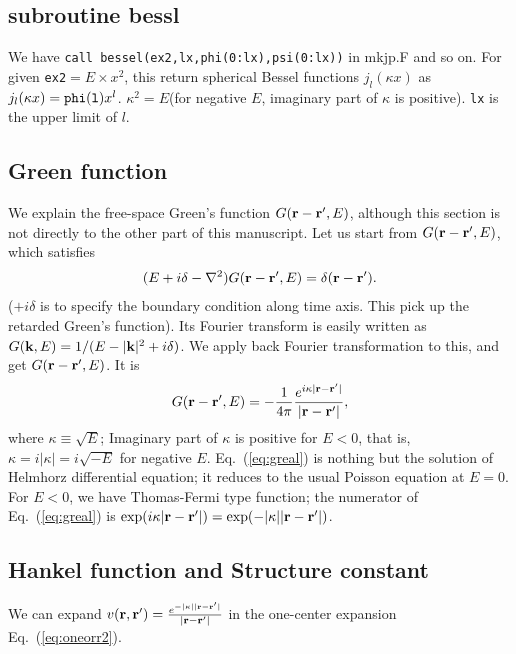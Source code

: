 \documentclass[a4paper,10pt,epsf,fleqn]{article}
\newcommand{\bfk}{{\bf k}}
\newcommand{\bfr}{{\bf r}}
\newcommand{\req}[1]{\mbox{Eq.~(\ref{#1})}}
\begin{document}
\subsection{subroutine bessl}
We have  \verb#call bessel(ex2,lx,phi(0:lx),psi(0:lx))# in mkjp.F 
and so on. For given \verb#ex2#$=E\times x^2$,
this return spherical Bessel functions $j_l(\kappa x)$
as $j_l(\kappa x)={\tt phi(l)}x^l$.
$\kappa^2=E$(for negative $E$, imaginary part of $\kappa$ is positive). 
\verb!lx! is the upper limit of $l$.


\subsection{Green function}
We explain the free-space Green's function
$G(\bfr-\bfr',E)$, although this section is not directly to the
other part of this manuscript.
Let us start from $G(\bfr-\bfr',E)$, which satisfies
\begin{eqnarray}
(E+i\delta-\nabla^2)G(\bfr-\bfr',E)=\delta(\bfr-\bfr').
\label{eq:diffg}
\end{eqnarray}
($+i\delta$ is to specify the boundary condition along time axis.
This pick up the retarded Green's function).
Its Fourier transform is easily written as
$G(\bfk,E)=1/(E-|\bfk|^2+ i \delta)$.
We apply back Fourier transformation to this, and get $G(\bfr-\bfr',E)$.
It is
\begin{eqnarray}
G(\bfr-\bfr',E)=-\frac{1}{4 \pi} 
\frac{e^{i \kappa|\bfr-\bfr'|}}{|\bfr-\bfr'|}, \label{eq:greal}
\end{eqnarray}
where $\kappa \equiv \sqrt{E}$; Imaginary part of $\kappa$ is positive
for $E<0$, that is, $\kappa = i |\kappa|= i \sqrt{-E}$ for negative $E$.
\req{eq:greal} is nothing but the solution of Helmhorz 
differential equation; it reduces to the usual Poisson equation at
$E=0$. For $E<0$, we have Thomas-Fermi type function;
the numerator of \req{eq:greal} is $\exp(i \kappa |\bfr-\bfr'|)=\exp(- |\kappa| |\bfr-\bfr'|)$.

\subsection{Hankel function and Structure constant}
We can expand 
$v(\bfr,\bfr')=\frac{e^{-|\kappa||\bfr-\bfr'|}}{|\bfr-\bfr'|}$
in the one-center expansion \req{eq:oneorr2}.
\end{document}
